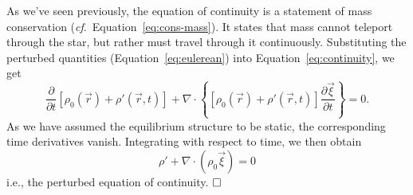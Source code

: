 \begin{description}
    \setlength{\itemindent}{0pt}
    \item[The continuity equation.]
    As we've seen previously, the equation of continuity is a statement of mass conservation (\emph{cf}.~Equation~\ref{eq:cons-mass}). 
    It states that mass cannot teleport through the star, but rather must travel through it continuously. 
    Substituting the perturbed quantities (Equation~\ref{eq:eulerean}) into Equation~\ref{eq:continuity}, we get 
    \begin{equation}
        \frac{\partial}{\partial t} \left[
            \rho_0(\vec r)
            +
            \rho' (\vec r, t)
        \right]
        +
        \nabla\cdot \left\{
            \left[
                \rho_0(\vec r)
                +
                \rho'(\vec r, t)
            \right]
            \frac{\partial\vec\xi}{\partial t} 
        \right\}
        =
        0.
    \end{equation}
    As we have assumed the equilibrium structure to be static, the corresponding time derivatives vanish. 
    Integrating with respect to time, we then obtain
    \begin{equation} \label{eq:perturbed-continuity} \boxed{
        \rho' 
        + 
        \nabla \cdot \left( 
            \rho_0 \vec\xi 
        \right) 
        = 
        0
    }\end{equation}
    i.e., the perturbed equation of continuity. $\hfill\square\;$
    

\end{description}
